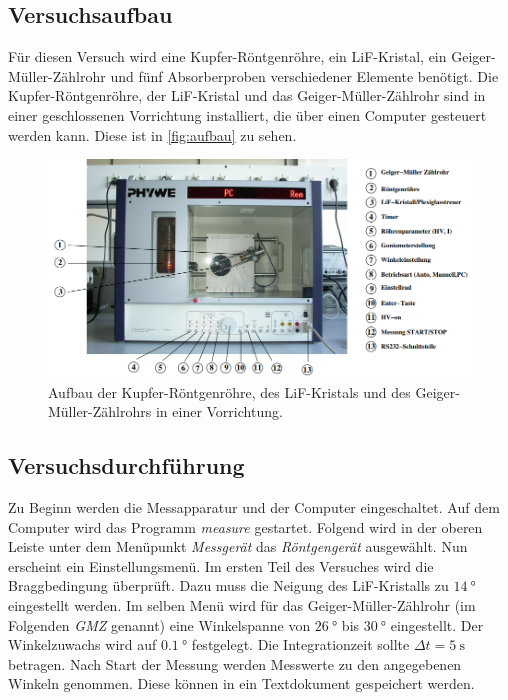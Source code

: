\subsection{Versuchsaufbau}
\label{subsec:Versuchsaufbau}
Für diesen Versuch wird eine Kupfer-Röntgenröhre, ein LiF-Kristal, ein Geiger-Müller-Zählrohr und fünf Absorberproben verschiedener Elemente benötigt. 
Die Kupfer-Röntgenröhre, der LiF-Kristal und das Geiger-Müller-Zählrohr sind in einer geschlossenen Vorrichtung installiert, die über einen Computer gesteuert
werden kann. Diese ist in \autoref{fig:aufbau} zu sehen.

\begin{figure}
    \centering
    \includegraphics[width = \textwidth]{content/aufbauskizze.PNG}
    \caption{Aufbau der Kupfer-Röntgenröhre, des LiF-Kristals und des Geiger-Müller-Zählrohrs in einer Vorrichtung. \cite{v602}}
    \label{fig:aufbau}
\end{figure}

\subsection{Versuchsdurchführung}
\label{subsec:versuchsdurchführung}
Zu Beginn werden die Messapparatur und der Computer eingeschaltet. Auf dem Computer wird das Programm \textit{measure} gestartet.
Folgend wird in der oberen Leiste unter dem Menüpunkt \textit{Messgerät} das \textit{Röntgengerät} ausgewählt. Nun erscheint ein Einstellungsmenü.
Im ersten Teil des Versuches wird die Braggbedingung überprüft. Dazu muss die Neigung des LiF-Kristalls zu $\qty{14}{\degree}$ eingestellt werden. 
Im selben 
Menü wird für das Geiger-Müller-Zählrohr (im Folgenden \textit{GMZ} genannt) eine Winkelspanne von $\qty{26}{\degree}$ bis $\qty{30}{\degree}$ eingestellt. Der Winkelzuwachs
wird auf $\qty{0.1}{\degree}$ festgelegt. Die Integrationzeit sollte $\Delta t = \qty{5}{\second}$ betragen.
Nach Start der Messung werden Messwerte zu den angegebenen Winkeln genommen. Diese können in ein Textdokument gespeichert werden.

